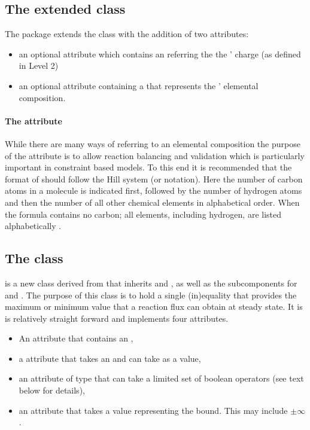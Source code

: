 \subsection{The extended  class}
\label{sbml-species}
\label{species-class}

The \FBC package extends the \SBML \Species class with the addition of two attributes:
\begin{itemize}
  \item an optional attribute  which contains an  referring the the \Species' charge (as defined in \SBML Level 2)
  \item an optional attribute  containing a  that represents the \Species' elemental composition.
\end{itemize}

\paragraph{The  attribute}
\label{chemicalFormula-attribute}
While there are many ways of referring to an elemental composition the purpose of the  attribute is to allow reaction balancing and validation which is particularly important in constraint based models. To this end it is recommended that the format of  should follow the Hill system (or notation). Here the number of carbon atoms in a molecule is indicated first, followed by the number of hydrogen atoms and then the number of all other chemical elements in alphabetical order. When the formula contains no carbon; all elements, including hydrogen, are listed alphabetically \cite{hillsystem, hillwikipedia}.

\subsection{The \FBC {} class}
\label{fluxbound-class}

\FluxBound is a new \FBC class derived from \SBML \SBase that inherits  and , as well as the subcomponents for \Annotation and \Notes. The purpose of this class is to hold a single (in)equality that provides the maximum or minimum value that a reaction flux can obtain at steady state. It is is relatively straight forward and implements four attributes.

\begin{itemize}
  \item An  attribute that contains an ,
  \item a  attribute that takes an  and can take \SBML \Reaction {} as a value,
  \item an  attribute of type  that can take a limited set of boolean operators (see text below for details),
  \item {} an attribute that takes a  value representing the bound. This may include $\pm\infty$.
\end{itemize}

